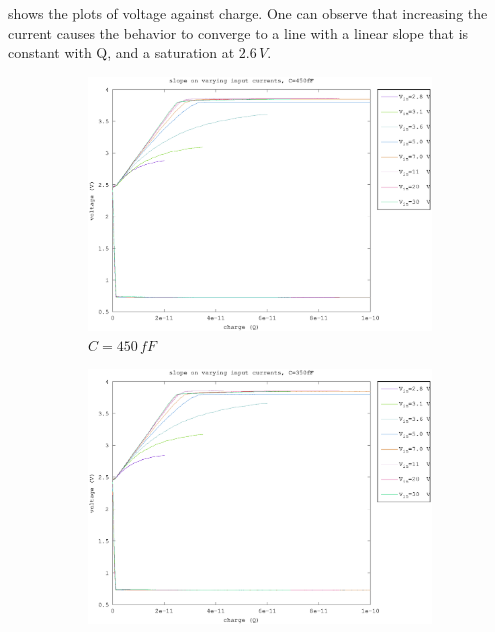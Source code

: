  shows the plots of voltage against charge. One can observe that increasing the current causes the behavior to converge to a line with a linear slope that is constant with Q, and a saturation at $2.6\,V$. 

\begin{figure}[h]
	\centering
	\begin{subfigure}[b]{0.475\textwidth}
	    \centering
	    \includegraphics[width=\textwidth]{fig/vbo_charge_450fF.eps}
	    \caption[Network2]%
	    {$C=450\,fF$}    
	    \label{fig:vbo_charges_450fF}
	\end{subfigure}
	\hfill
	\begin{subfigure}[b]{0.475\textwidth}  
	    \centering 
	    \includegraphics[width=\textwidth]{fig/vbo_charge_350fF.eps}

\end{subfigure}
\end{figure}
